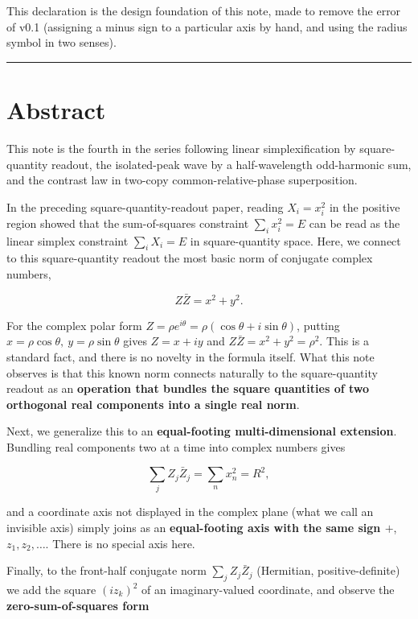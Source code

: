 \documentclass[11pt,a4paper]{article}
\begin{document}
This declaration is the design foundation of this note, made to remove
the error of v0.1 (assigning a minus sign to a particular axis by hand,
and using the radius symbol in two senses).

\begin{center}\rule{0.5\linewidth}{0.5pt}\end{center}

\section{Abstract}\label{abstract}

This note is the fourth in the series following linear simplexification
by square-quantity readout, the isolated-peak wave by a half-wavelength
odd-harmonic sum, and the contrast law in two-copy common-relative-phase
superposition.

In the preceding square-quantity-readout paper, reading \(X_i=x_i^2\) in
the positive region showed that the sum-of-squares constraint
\(\sum_i x_i^2=E\) can be read as the linear simplex constraint
\(\sum_i X_i=E\) in square-quantity space. Here, we connect to this
square-quantity readout the most basic norm of conjugate complex
numbers,

\[
Z\bar Z=x^2+y^2 .
\]

For the complex polar form
\(Z=\rho e^{i\theta}=\rho(\cos\theta+i\sin\theta)\), putting
\(x=\rho\cos\theta,\ y=\rho\sin\theta\) gives \(Z=x+iy\) and
\(Z\bar Z=x^2+y^2=\rho^2\). This is a standard fact, and there is no
novelty in the formula itself. What this note observes is that this
known norm connects naturally to the square-quantity readout as an
\textbf{operation that bundles the square quantities of two orthogonal
real components into a single real norm}.

Next, we generalize this to an \textbf{equal-footing multi-dimensional
extension}. Bundling real components two at a time into complex numbers
gives

\[
\sum_j Z_j\bar Z_j=\sum_n x_n^2=R^2 ,
\]

and a coordinate axis not displayed in the complex plane (what we call
an invisible axis) simply joins as an \textbf{equal-footing axis with
the same sign \(+\)}, \(z_1,z_2,\dots\). There is no special axis here.

Finally, to the front-half conjugate norm \(\sum_j Z_j\bar Z_j\)
(Hermitian, positive-definite) we add the square \((i z_k)^2\) of an
imaginary-valued coordinate, and observe the \textbf{zero-sum-of-squares
form}
\end{document}
